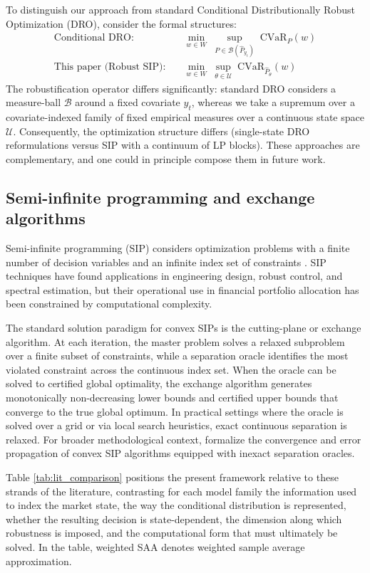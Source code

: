\documentclass[smallextended]{svjour3}
\begin{document}
To distinguish our approach from standard Conditional Distributionally Robust Optimization (DRO), consider the formal structures:
\begin{align}
\text{Conditional DRO:} &\quad \min_{w \in W}\;\sup_{P \in \mathcal{B}(\hat{P}_{y_t})}\; \mathrm{CVaR}_{P}(w) \label{eq:dro_contrast} \\
\text{This paper (Robust SIP):} &\quad \min_{w \in W}\;\sup_{\theta \in \mathcal{U}}\; \mathrm{CVaR}_{\hat{P}_\theta}(w) \label{eq:sip_contrast}
\end{align}
The robustification operator differs significantly: standard DRO considers a measure-ball $\mathcal{B}$ around a fixed covariate $y_t$, whereas we take a supremum over a covariate-indexed family of fixed empirical measures over a continuous state space $\mathcal{U}$. Consequently, the optimization structure differs (single-state DRO reformulations versus SIP with a continuum of LP blocks). These approaches are complementary, and one could in principle compose them in future work.

\subsection{Semi-infinite programming and exchange algorithms}
Semi-infinite programming (SIP) considers optimization problems with a finite number of decision variables and an infinite index set of constraints \cite{hettich1993semi, lopez2007semi}. SIP techniques have found applications in engineering design, robust control, and spectral estimation, but their operational use in financial portfolio allocation has been constrained by computational complexity.

The standard solution paradigm for convex SIPs is the cutting-plane or exchange algorithm. At each iteration, the master problem solves a relaxed subproblem over a finite subset of constraints, while a separation oracle identifies the most violated constraint across the continuous index set. When the oracle can be solved to certified global optimality, the exchange algorithm generates monotonically non-decreasing lower bounds and certified upper bounds that converge to the true global optimum. In practical settings where the oracle is solved over a grid or via local search heuristics, exact continuous separation is relaxed. For broader methodological context, \cite{oustry2025convex} formalize the convergence and error propagation of convex SIP algorithms equipped with inexact separation oracles.


Table \ref{tab:lit_comparison} positions the present framework relative to these
strands of the literature, contrasting for each model family the information
used to index the market state, the way the conditional distribution is
represented, whether the resulting decision is state-dependent, the dimension
along which robustness is imposed, and the computational form that must
ultimately be solved. In the table, weighted SAA denotes weighted sample
average approximation.
\end{document}
